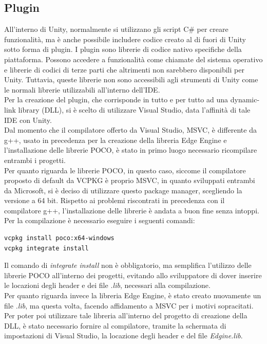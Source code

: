 \subsection{Plugin}\label{plugin}
All'interno di Unity, normalmente si utilizzano gli script C\# per creare funzionalità, ma è anche possibile includere codice creato al di fuori di Unity sotto forma di plugin. I plugin sono librerie di codice nativo specifiche della piattaforma. Possono accedere a funzionalità come chiamate del sistema operativo e librerie di codici di terze parti che altrimenti non sarebbero disponibili per Unity. Tuttavia, queste librerie non sono accessibili agli strumenti di Unity come le normali librerie utilizzabili all'interno dell’IDE. \\
Per la creazione del plugin, che corrisponde in tutto e per tutto ad una dynamic-link library (DLL), si è scelto di utilizzare Visual Studio, data l'affinità di tale IDE con Unity.\\
Dal momento che il compilatore offerto da Visual Studio, MSVC, è differente da g++, usato in precedenza per la creazione della libreria Edge Engine e l’installazione delle librerie POCO, è stato in primo luogo necessario ricompilare entrambi i progetti.\\
Per quanto riguarda le librerie POCO, in questo caso, siccome il compilatore proposto di default da VCPKG è proprio MSVC, in quanto sviluppati entrambi da Microsoft, si è deciso di utilizzare questo package manager, scegliendo la versione a 64 bit. Rispetto ai problemi riscontrati in precedenza con il compilatore g++, l’installazione delle librerie è andata a buon fine senza intoppi. Per la compilazione è necessario eseguire i seguenti comandi:
\begin{verbatim}
vcpkg install poco:x64-windows
vcpkg integrate install
\end{verbatim}
Il comando di \textit{integrate install} non è obbligatorio, ma semplifica l'utilizzo delle librerie POCO all'interno dei progetti, evitando allo sviluppatore di dover inserire le locazioni degli header e dei file \textit{.lib}, necessari alla compilazione.\\
Per quanto riguarda invece la libreria Edge Engine, è stato creato nuovamente un file \textit{.lib}, ma questa volta, facendo affidamento a MSVC per i motivi sopracitati. Per poter poi utilizzare tale libreria all'interno del progetto di creazione della DLL, è stato necessario fornire al compilatore, tramite la schermata di impostazioni di Visual Studio, la locazione degli header e del file \textit{Edgine.lib}.\\
